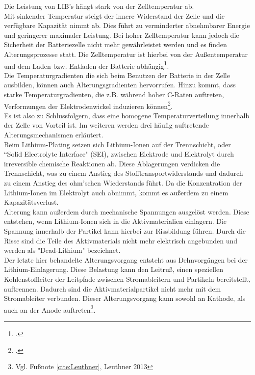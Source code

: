 Die Leistung von LIB's hängt stark von der Zelltemperatur ab. \\
Mit sinkender Temperatur steigt der innere Widerstand der Zelle und die verfügbare Kapazität nimmt ab. Dies führt zu verminderter abnehmbarer Energie und geringerer maximaler Leistung. Bei hoher Zelltemperatur kann jedoch die Sicherheit der Batteriezelle nicht mehr gewährleistet werden und es finden Alterungsprozesse statt. Die Zelltemperatur ist hierbei von der Außentemperatur und dem Laden bzw. Entladen der Batterie abhängig\footcite[Vgl.][S.1001-1010]{Liu2014}. \\
Die Temperaturgradienten die sich beim Benutzen der Batterie in der Zelle ausbilden, können auch Alterungsgradienten hervorrufen. Hinzu kommt, dass starke Temperaturgradienten, die z.B. während hoher C-Raten auftreten, Verformungen der Elektrodenwickel induzieren können\footcite[Vgl.][S.921-927]{Waldmann2015}.\\
Es ist also zu Schlussfolgern, dass eine homogene Temperaturverteilung innerhalb der Zelle von Vorteil ist.
Im weiteren werden drei häufig auftretende Alterungsmechanismen erläutert.\\
Beim Lithium-Plating setzen sich Lithium-Ionen auf der Trennschicht, oder ``Solid Electrolyte Interface" (SEI), zwischen Elektrode und Elektrolyt durch irreversible chemische Reaktionen ab. Diese Ablagerungen verdicken die Trennschicht, was zu einem Anstieg des Stofftransportwiderstands und dadurch zu einem Anstieg des ohm'schen Wiederstands führt. Da die Konzentration der Lithium-Ionen im Elektrolyt auch abnimmt, kommt es außerdem zu einem Kapazitätsverlust.\\
Alterung kann außerdem durch mechanische Spannungen ausgelöst werden. Diese entstehen, wenn Lithium-Ionen sich in die Aktivmaterialien einlagern. Die Spannung innerhalb der Partikel kann hierbei zur Rissbildung führen. Durch die Risse sind die Teile des Aktivmaterials nicht mehr elektrisch angebunden und werden als "Dead-Lithium" bezeichnet.\\
Der letzte hier behandelte Alterungsvorgang entsteht aus Dehnvorgängen bei der Lithium-Einlagerung. Diese Belastung kann den Leitruß, einen speziellen Kohlenstoffleiter der Leitpfade zwischen Stromableitern und Partikeln bereitstellt, auftrennen. Dadurch sind die Aktivmaterialpartikel nicht mehr mit dem Stromableiter verbunden. Dieser Alterungsvorgang kann sowohl an Kathode, als auch an der Anode auftreten\footnote{Vgl. Fußnote \ref{cite:Leuthner}, Leuthner 2013}.\\

